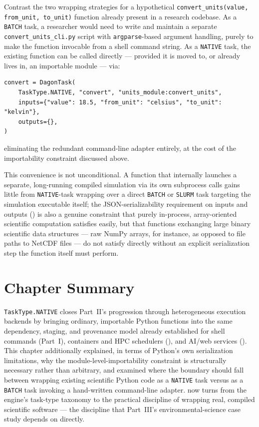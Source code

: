 \begin{example}
Contrast the two wrapping strategies for a hypothetical
\texttt{convert\_units(value, from\_unit, to\_unit)} function already
present in a research codebase. As a \texttt{BATCH} task, a researcher would
need to write and maintain a separate \texttt{convert\_units\_cli.py}
script with \texttt{argparse}-based argument handling, purely to make the
function invocable from a shell command string. As a \texttt{NATIVE} task,
the existing function can be called directly --- provided it is moved to,
or already lives in, an importable module --- via:
\begin{lstlisting}
convert = DagonTask(
    TaskType.NATIVE, "convert", "units_module:convert_units",
    inputs={"value": 18.5, "from_unit": "celsius", "to_unit": "kelvin"},
    outputs={},
)
\end{lstlisting}
eliminating the redundant command-line adapter entirely, at the cost of the
importability constraint discussed above.
\end{example}

\begin{cautionbox}
This convenience is not unconditional. A function that internally launches
a separate, long-running compiled simulation via its own subprocess calls
gains little from \texttt{NATIVE}-task wrapping over a direct
\texttt{BATCH} or \texttt{SLURM} task targeting the simulation executable
itself; the JSON-serializability requirement on inputs and outputs
() is also a genuine constraint that purely in-process,
array-oriented scientific computation satisfies easily, but that functions
exchanging large binary scientific data structures --- raw NumPy arrays, for
instance, as opposed to file paths to NetCDF files --- do not satisfy
directly without an explicit serialization step the function itself must
perform.
\end{cautionbox}

\section{Chapter Summary}

\texttt{TaskType.NATIVE} closes Part~II's progression through heterogeneous
execution backends by bringing ordinary, importable Python functions into
the same dependency, staging, and provenance model already established for
shell commands (Part~I), containers and HPC schedulers
(), and AI/web services ().
This chapter additionally explained, in terms of Python's own serialization
limitations, why the module-level-importability constraint is structurally
necessary rather than arbitrary, and examined where the boundary should fall
between wrapping existing scientific Python code as a \texttt{NATIVE} task
versus as a \texttt{BATCH} task invoking a hand-written command-line
adapter.  now turns from the engine's task-type
taxonomy to the practical discipline of wrapping real, compiled scientific
software --- the discipline that Part~III's environmental-science case study
depends on directly.

